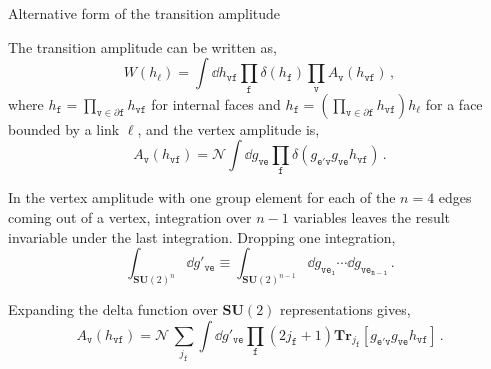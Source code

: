 \documentclass[12pt,titlepage]{article}
\begin{document}
\begin{frame}{Alternative form of the transition amplitude}
    \begin{list}{\,}{\leftmargin=1em \itemindent=0em}
        \item<1-> The transition amplitude can be written as,\vspace{-4pt}
        \begin{equation}
            W(h_\ell)=\int\dd{h_\mathtt{vf}}\prod_\mathtt{f}\delta(h_\mathtt{f})\prod_\mathtt{v}A_\mathtt{v}(h_\mathtt{vf})\,,
        \end{equation}
        where $h_\mathtt{f}=\prod\limits_{\mathtt{v}\in\partial\mathtt{f}}h_\mathtt{vf}$ for internal faces and $h_\mathtt{f}=\left(\prod\limits_{\mathtt{v}\in\partial\mathtt{f}}h_\mathtt{vf}\right)h_\ell$ for a face bounded by a link $\ell$, and the vertex amplitude is,\vspace{-4pt}
        \begin{equation}
            A_\mathtt{v}(h_\mathtt{vf})=\mathcal{N}\int\dd{g_\mathtt{ve}}\prod_\mathtt{f}\delta(g_\mathtt{e'v}g_\mathtt{ve}h_\mathtt{vf})\,.
        \end{equation}
        \item<2-> In the vertex amplitude with one group element for each of the $n=4$ edges coming out of a vertex, integration over $n-1$ variables leaves the result invariable under the last integration. Dropping one integration,\vspace{-3pt}
        \begin{equation}
            \int_{{\mathbf{SU}(2)}^n}\dd{g'_{\mathtt{ve}}}\equiv\int_{{\mathbf{SU}(2)}^{n-1}}\dd{g_{\mathtt{ve_1}}}\cdots\dd{g_{\mathtt{ve_{n-1}}}}\,.
        \end{equation}
        \item<3-> Expanding the delta function over $\mathbf{SU}(2)$ representations gives,\vspace{-4pt}
        \begin{equation}
            A_\mathtt{v}(h_\mathtt{vf})=\mathcal{N}\,\sum_{j_\mathtt{f}}\int\dd{g'_\mathtt{ve}}\prod_\mathtt{f}(2j_\mathtt{f}+1)\mathbf{Tr}_{j_\mathtt{f}}[g_\mathtt{e'v}g_\mathtt{ve}h_\mathtt{vf}]\,.
        \end{equation}
    \end{list}
\end{frame}

\end{document}
